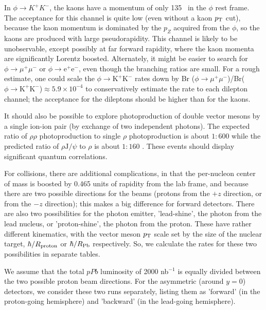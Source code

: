 \documentclass[../report.tex]{subfiles}
\begin{document}
In $\phi \rightarrow K^+K^-$, the kaons have a momentum of only 135 \UMeVc\ in the $\phi$ rest frame.   The acceptance for this channel is quite low (even without a kaon $p\sb{\scriptstyle\mathrm{T}}$ cut), because the kaon momentum is dominated by the $p_Z$ acquired from the $\phi$, so the kaons are produced with large pseudorapidity.   This channel is likely to be unobservable, except possibly at far forward rapidity, where the kaon momenta are significantly Lorentz boosted.  Alternately, it might be easier to search for $\phi \rightarrow \mu^+ \mu^-$ or $\phi \rightarrow \mathrm{e}^+ \mathrm{e}^-$, even though the branching ratios are small. For a rough estimate, one could scale the $\phi\rightarrow \mathrm{K}^+\mathrm{K}^-$ rates down by Br ($\phi \rightarrow \mu^+ \mu^-$)/Br($\phi \rightarrow \mathrm{K}^+\mathrm{K}^-$)$\approx 5.9 \times 10^{-4}$ to conservatively estimate the rate to each dilepton channel; the acceptance for the dileptons should be higher than for the kaons. 

It should also be possible to explore photoproduction of double vector mesons by a single ion-ion pair (by exchange of two independent photons).   The expected ratio of $\rho\rho$ photoproduction to single $\rho$ photoproduction is about $1:600$ while the predicted ratio of $\rho \mathrm{J/}\psi$ to $\rho$ is about $1:160$ \cite{Klein:1999qj}.  
These events should display significant quantum correlations.  

For \pPb collisions, there are additional complications, in that the per-nucleon center of mass is boosted by 0.465 units of rapidity from the lab frame, and because there are two possible directions for the beams (protons from the $+z$ direction, or from the $-z$ direction); this makes a big difference for forward detectors.  There are also two possibilities for the photon emitter, 'lead-shine', the photon from the lead nucleus, or 'proton-shine', the photon from the proton.  These have rather different kinematics, with the vector meson $p\sb{\scriptstyle\mathrm{T}}$ scale set by the size of the nuclear target, $\hbar/R_{\rm proton}$ or $\hbar/R_{\rm Pb}$ respectively.    So, we calculate the rates for these two possibilities in separate tables.

We assume that the total $pPb$ luminosity of 2000 nb$^{-1}$ is equally divided between the two possible proton beam directions.  For the asymmetric (around $y=0$) detectors, we consider these two runs separately, listing them as 'forward' (in the proton-going hemisphere) and 'backward' (in the lead-going hemisphere).  
\end{document}
